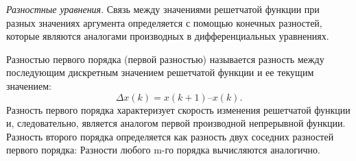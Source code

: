 \textit{Разностные уравнения}. Связь между значениями решетчатой функции при разных значениях аргумента определяется с помощью конечных разностей, которые являются аналогами производных в дифференциальных уравнениях. 

Разностью первого порядка (первой разностью) называется разность между последующим дискретным значением решетчатой функции и ее текущим значением:
\begin{equation}
    \Delta x(k) = x(k+1) – x(k).
\end{equation}
Разность первого порядка характеризует скорость изменения решетчатой функции и, следовательно, является аналогом первой производной непрерывной функции.
Разность второго порядка определяется как разность двух соседних разностей первого порядка:
Разности любого m-го порядка вычисляются аналогично.
